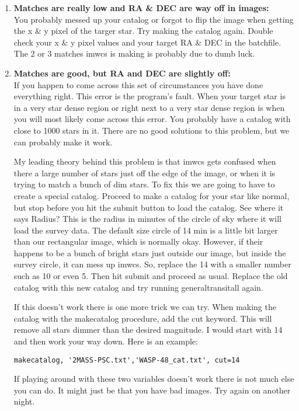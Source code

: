 \documentclass[10pt,preprint]{aastex}
\begin{document}
\begin{enumerate}
\item \textbf{Matches are really low and RA \& DEC are way off in images:}\\
You probably messed up your catalog or forgot to flip the image when getting the x \& y pixel of the targer star. Try making the catalog again. Double check your x \& y pixel values and your target RA \& DEC in the batchfile. The 2 or 3 matches imwcs is making is probably due to dumb luck.
\item \textbf{Matches are good, but RA and DEC are slightly off:}\\
If you happen to come across this set of circumstances you have done everything right. This error is the program's fault. When your target star is in a very star dense region or right next to a very star dense region is when you will most likely come across this error. You probably have a catalog with close to 1000 stars in it. There are no good solutions to this problem, but we can probably make it work. 

My leading theory behind this problem is that imwcs gets confused when there a large number of stars just off the edge of the image, or when it is trying to match a bunch of dim stars. To fix this we are going to have to create a special catalog. Proceed to make a catalog for your star like normal, but stop before you hit the submit button to load the catalog. See where it says Radius? This is the radius in minutes of the circle of sky where it will load the survey data. The default size circle of 14 min is a little bit larger than our rectangular image, which is normally okay. However, if their happens to be a bunch of bright stars just outside our image, but inside the survey circle, it can mess up imwcs. So, replace the 14 with a smaller number such as 10 or even 5. Then hit submit and proceed as usual. Replace the old catalog with this new catalog and try running generaltransitall again.

If this doesn't work there is one more trick we can try. When making the catalog with the makecatalog procedure, add the cut keyword. This will remove all stars dimmer than the desired magnitude. I would start with 14 and then work your way down. Here is an example:

\begin{verbatim}
makecatalog, '2MASS-PSC.txt','WASP-48_cat.txt', cut=14
\end{verbatim}

If playing around with these two variables doesn't work there is not much else you can do. It might just be that you have bad images. Try again on another night.
\end{enumerate}
\end{document}
